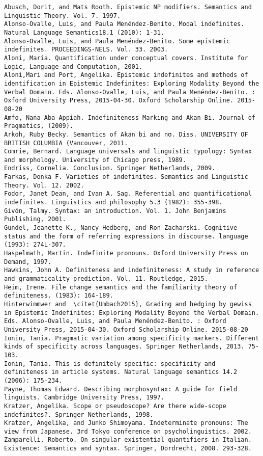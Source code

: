 \documentclass[output=paper,modfonts,nonflat,draftmode]{langsci/langscibook}
\begin{document}
\begin{verbatim}
Abusch, Dorit, and Mats Rooth. Epistemic NP modifiers. Semantics and Linguistic Theory. Vol. 7. 1997.
Alonso-Ovalle, Luis, and Paula Menéndez-Benito. Modal indefinites. Natural Language Semantics18.1 (2010): 1-31.
Alonso-Ovalle, Luis, and Paula Menéndez-Benito. Some epistemic indefinites. PROCEEDINGS-NELS. Vol. 33. 2003.
Aloni, Maria. Quantification under conceptual covers. Institute for Logic, Language and Computation, 2001.
Aloni,Mari and Port, Angelika. Epistemic indefinites and methods of identification in Epistemic Indefinites: Exploring Modality Beyond the Verbal Domain. Eds. Alonso-Ovalle, Luis, and Paula Menéndez-Benito. : Oxford University Press, 2015-04-30. Oxford Scholarship Online. 2015-08-20
Amfo, Nana Aba Appiah. Indefiniteness Marking and Akan Bi. Journal of Pragmatics, (2009).
Arkoh, Ruby Becky. Semantics of Akan bi and nʊ. Diss. UNIVERSITY OF BRITISH COLUMBIA (Vancouver, 2011.
Comrie, Bernard. Language universals and linguistic typology: Syntax and morphology. University of Chicago press, 1989.
Endriss, Cornelia. Conclusion. Springer Netherlands, 2009.
Farkas, Donka F. Varieties of indefinites. Semantics and Linguistic Theory. Vol. 12. 2002.
Fodor, Janet Dean, and Ivan A. Sag. Referential and quantificational indefinites. Linguistics and philosophy 5.3 (1982): 355-398.
Givón, Talmy. Syntax: an introduction. Vol. 1. John Benjamins Publishing, 2001.
Gundel, Jeanette K., Nancy Hedberg, and Ron Zacharski. Cognitive status and the form of referring expressions in discourse. language (1993): 274L-307. 
Haspelmath, Martin. Indefinite pronouns. Oxford University Press on Demand, 1997.
Hawkins, John A. Definiteness and indefiniteness: A study in reference and grammaticality prediction. Vol. 11. Routledge, 2015.
Heim, Irene. File change semantics and the familiarity theory of definiteness. (1983): 164-189.
Hinterwimmwer and  \citet{Umbach2015}, Grading and hedging by gewiss in Epistemic Indefinites: Exploring Modality Beyond the Verbal Domain. Eds. Alonso-Ovalle, Luis, and Paula Menéndez-Benito. : Oxford University Press, 2015-04-30. Oxford Scholarship Online. 2015-08-20
Ionin, Tania. Pragmatic variation among specificity markers. Different kinds of specificity across languages. Springer Netherlands, 2013. 75-103.
Ionin, Tania. This is definitely specific: specificity and definiteness in article systems. Natural language semantics 14.2 (2006): 175-234.
Payne, Thomas Edward. Describing morphosyntax: A guide for field linguists. Cambridge University Press, 1997.
Kratzer, Angelika. Scope or pseudoscope? Are there wide-scope indefinites?. Springer Netherlands, 1998.
Kratzer, Angelika, and Junko Shimoyama. Indeterminate pronouns: The view from Japanese. 3rd Tokyo conference on psycholinguistics. 2002.
Zamparelli, Roberto. On singular existential quantifiers in Italian. Existence: Semantics and syntax. Springer, Dordrecht, 2008. 293-328. 
\end{verbatim}




\sloppy
\printbibliography[heading=subbibliography,notkeyword=this]
\end{document}
